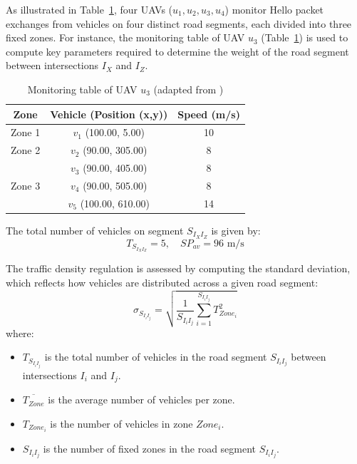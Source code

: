 As illustrated in Table~\ref{tab:monitoring_table}, four UAVs (\( u_1, u_2, u_3, u_4 \)) monitor Hello packet exchanges from vehicles on four distinct road segments, each divided into three fixed zones. For instance, the monitoring table of UAV \( u_3 \) (Table~\ref{tab:monitoring_table}) is used to compute key parameters required to determine the weight of the road segment between intersections \( I_X \) and \( I_Z \).

\begin{table}[H]
    \centering
    \caption{Monitoring table of UAV \( u_3 \) (adapted from \cite{oubbati2019leveraging})}
    \label{tab:monitoring_table}
    \begin{tabular}{|c|c|c|}
        \hline
        \textbf{Zone} & \textbf{Vehicle (Position (x,y))} & \textbf{Speed (m/s)} \\
        \hline
        Zone 1 & \( v_1 \) (100.00, 5.00) & 10 \\
        \hline
        Zone 2 & \( v_2 \) (90.00, 305.00) & 8 \\
               & \( v_3 \) (90.00, 405.00) & 8 \\
        \hline
        Zone 3 & \( v_4 \) (90.00, 505.00) & 8 \\
               & \( v_5 \) (100.00, 610.00) & 14 \\
        \hline
    \end{tabular}
\end{table}

The total number of vehicles on segment \( S_{I_X I_Z} \) is given by:
\begin{equation}
    T_{S_{I_X I_Z}} = 5, \quad SP_{av} = 96 \text{ m/s}
\end{equation}

The traffic density regulation is assessed by computing the standard deviation, which reflects how vehicles are distributed across a given road segment:
\begin{equation}
    \sigma_{S_{I_i I_j}} = \sqrt{\frac{1}{S_{I_i I_j}} \sum_{i=1}^{S_{I_i I_j}} T_{Zone_i}^2 }
\end{equation}
where:
\begin{itemize}
    \item \( T_{S_{I_i I_j}} \) is the total number of vehicles in the road segment \( S_{I_i I_j} \) between intersections \( I_i \) and \( I_j \).
    \item \( \overline{T_{Zone}} \) is the average number of vehicles per zone.
    \item \( T_{Zone_i} \) is the number of vehicles in zone \( Zone_i \).
    \item \( S_{I_i I_j} \) is the number of fixed zones in the road segment \( S_{I_i I_j} \).
\end{itemize}

